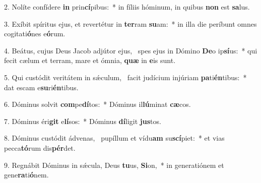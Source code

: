 2. Nolíte confídere \textbf{in} prin\textbf{cí}pibus:~*  in fíliis hóminum, in quibus \textbf{non} est \textbf{sa}lus.\

3. Exíbit spíritus ejus, et revertétur in \textbf{ter}ram \textbf{su}am:~*  in illa die períbunt omnes cogitati\textbf{ó}nes e\textbf{ó}rum.\

4. Beátus, cujus Deus Jacob adjútor ejus, \dag\  spes ejus in Dómino \textbf{De}o ip\textbf{sí}us:~*  qui fecit cælum et terram, mare et ómnia, \textbf{quæ} in \textbf{e}is sunt.\

5. Qui custódit veritátem in sǽculum, \dag\  facit judícium injúriam \textbf{pa}ti\textbf{én}tibus:~*  dat escam e\textbf{su}ri\textbf{én}tibus.\

6. Dóminus solvit \textbf{com}pe\textbf{dí}tos:~*  Dóminus il\textbf{lú}minat \textbf{cæ}cos.\

7. Dóminus éri\textbf{git} e\textbf{lí}sos:~*  Dóminus \textbf{dí}ligit \textbf{jus}tos.\

8. Dóminus custódit ádvenas, \dag\  pupíllum et vídu\textbf{am} su\textbf{scí}piet:~*  et vias pecca\textbf{tó}rum dis\textbf{pér}det.\

9. Regnábit Dóminus in sǽcula, Deus \textbf{tu}us, \textbf{Si}on,~*  in generatiónem et gene\textbf{ra}ti\textbf{ó}nem.\

